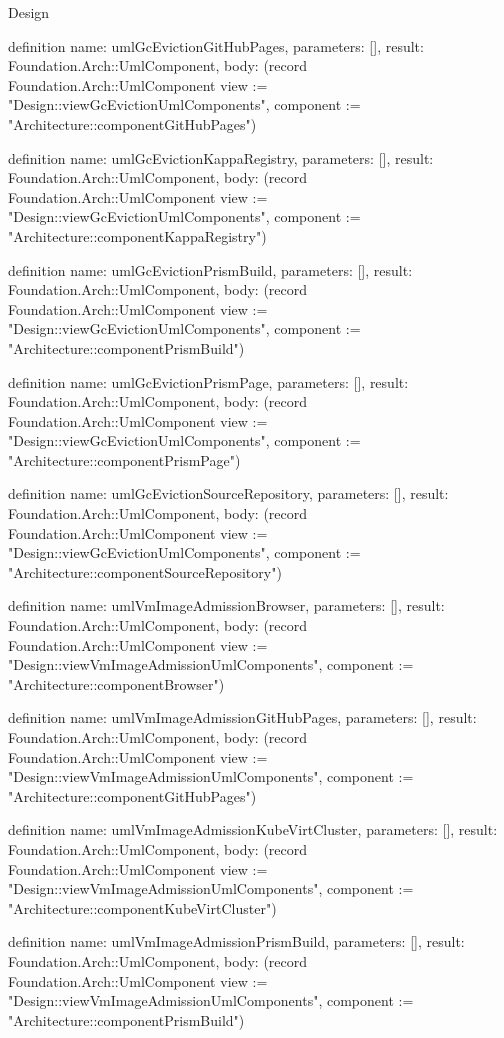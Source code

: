 \begin{lexlean}{Design}
\begin{semanticmodule}
definition{
  name: umlGcEvictionGitHubPages,
  parameters: [],
  result: Foundation.Arch::UmlComponent,
  body: (record Foundation.Arch::UmlComponent {view := "Design::viewGcEvictionUmlComponents", component := "Architecture::componentGitHubPages"})
}

definition{
  name: umlGcEvictionKappaRegistry,
  parameters: [],
  result: Foundation.Arch::UmlComponent,
  body: (record Foundation.Arch::UmlComponent {view := "Design::viewGcEvictionUmlComponents", component := "Architecture::componentKappaRegistry"})
}

definition{
  name: umlGcEvictionPrismBuild,
  parameters: [],
  result: Foundation.Arch::UmlComponent,
  body: (record Foundation.Arch::UmlComponent {view := "Design::viewGcEvictionUmlComponents", component := "Architecture::componentPrismBuild"})
}

definition{
  name: umlGcEvictionPrismPage,
  parameters: [],
  result: Foundation.Arch::UmlComponent,
  body: (record Foundation.Arch::UmlComponent {view := "Design::viewGcEvictionUmlComponents", component := "Architecture::componentPrismPage"})
}

definition{
  name: umlGcEvictionSourceRepository,
  parameters: [],
  result: Foundation.Arch::UmlComponent,
  body: (record Foundation.Arch::UmlComponent {view := "Design::viewGcEvictionUmlComponents", component := "Architecture::componentSourceRepository"})
}

definition{
  name: umlVmImageAdmissionBrowser,
  parameters: [],
  result: Foundation.Arch::UmlComponent,
  body: (record Foundation.Arch::UmlComponent {view := "Design::viewVmImageAdmissionUmlComponents", component := "Architecture::componentBrowser"})
}

definition{
  name: umlVmImageAdmissionGitHubPages,
  parameters: [],
  result: Foundation.Arch::UmlComponent,
  body: (record Foundation.Arch::UmlComponent {view := "Design::viewVmImageAdmissionUmlComponents", component := "Architecture::componentGitHubPages"})
}

definition{
  name: umlVmImageAdmissionKubeVirtCluster,
  parameters: [],
  result: Foundation.Arch::UmlComponent,
  body: (record Foundation.Arch::UmlComponent {view := "Design::viewVmImageAdmissionUmlComponents", component := "Architecture::componentKubeVirtCluster"})
}

definition{
  name: umlVmImageAdmissionPrismBuild,
  parameters: [],
  result: Foundation.Arch::UmlComponent,
  body: (record Foundation.Arch::UmlComponent {view := "Design::viewVmImageAdmissionUmlComponents", component := "Architecture::componentPrismBuild"})
}


\end{semanticmodule}
\end{lexlean}
